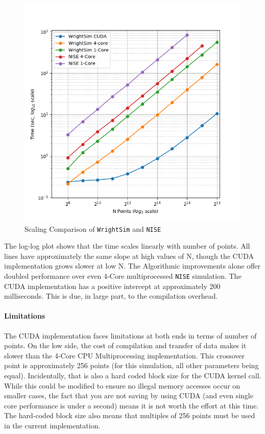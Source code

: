 \begin{figure}
\centering
	\includegraphics[width=\textwidth]{simulation/images/Scaling.png}
\caption{Scaling Comparison of \texttt{WrightSim} and \texttt{NISE}
\label{sim:fig:scaling}}
\end{figure}

The log-log plot shows that the time scales linearly with number of
points. All lines have approximately the same slope at high values of N,
though the CUDA implementation grows slower at low N. The Algorithmic
improvements alone offer doubled performance over even 4-Core
multiprocessed \texttt{NISE} simulation. The CUDA implementation has a
positive intercept at approximately 200 milliseconds. This is due, in
large part, to the compilation overhead.

\hypertarget{limitations}{%
\paragraph{Limitations}\label{limitations}}

The CUDA implementation faces limitations at both ends in terms of
number of points. On the low side, the cost of compilation and transfer
of data makes it slower than the 4-Core CPU Multiprocessing
implementation. This crossover point is approximately 256 points (for
this simulation, all other parameters being equal). Incidentally, that
is also a hard coded block size for the CUDA kernel call. While this
could be modified to ensure no illegal memory accesses occur on smaller
cases, the fact that you are not saving by using CUDA (and even single
core performance is under a second) means it is not worth the effort at
this time. The hard-coded block size also means that multiples of 256
points must be used in the current implementation.

